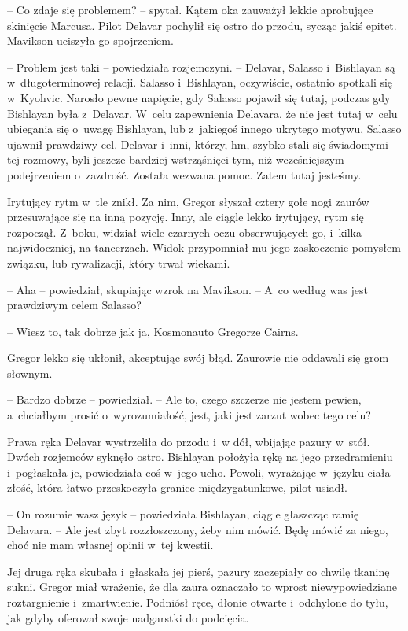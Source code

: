 \documentclass[oneside,polish,12pt,sfheadings]{mwbk}
\begin{document}
-- Co zdaje się problemem? -- spytał. Kątem oka zauważył lekkie aprobujące
skinięcie Marcusa. Pilot Delavar pochylił się ostro do przodu, sycząc
jakiś epitet. Mavikson uciszyła go spojrzeniem.

-- Problem jest taki -- powiedziała rozjemczyni. -- Delavar, Salasso i~Bishlayan są w~długoterminowej relacji. Salasso i~Bishlayan, oczywiście,
ostatnio spotkali się w~Kyohvic. Narosło pewne napięcie, gdy Salasso
pojawił się tutaj, podczas gdy Bishlayan była z~Delavar. W~celu
zapewnienia Delavara, że nie jest tutaj w~celu ubiegania się o~uwagę
Bishlayan, lub z~jakiegoś innego ukrytego motywu, Salasso ujawnił
prawdziwy cel. Delavar i~inni, którzy, hm, szybko stali się świadomymi
tej rozmowy, byli jeszcze bardziej wstrząśnięci tym, niż wcześniejszym
podejrzeniem o~zazdrość. Została wezwana pomoc. Zatem tutaj jesteśmy.

Irytujący rytm w~tle znikł. Za nim, Gregor słyszał cztery gołe nogi
zaurów przesuwające się na inną pozycję. Inny, ale ciągle lekko
irytujący, rytm się rozpoczął. Z~boku, widział wiele czarnych oczu
obserwujących go, i~kilka najwidoczniej, na tancerzach. Widok
przypomniał mu jego zaskoczenie pomysłem związku, lub rywalizacji, który
trwał wiekami.

-- Aha -- powiedział, skupiając wzrok na Mavikson. -- A~co według was jest
prawdziwym celem Salasso?

-- Wiesz to, tak dobrze jak ja, Kosmonauto Gregorze Cairns.

Gregor lekko się ukłonił, akceptując swój błąd. Zaurowie nie oddawali
się grom słownym.

-- Bardzo dobrze -- powiedział. -- Ale to, czego szczerze nie jestem
pewien, a~chciałbym prosić o~wyrozumiałość, jest, jaki jest zarzut wobec
tego celu?

Prawa ręka Delavar wystrzeliła do przodu i~w dół, wbijając pazury w~stół. Dwóch rozjemców syknęło ostro. Bishlayan położyła rękę na jego
przedramieniu i~pogłaskała je, powiedziała coś w~jego ucho. Powoli,
wyrażając w~języku ciała złość, która łatwo przeskoczyła granice
międzygatunkowe, pilot usiadł.

-- On rozumie wasz język -- powiedziała Bishlayan, ciągle głaszcząc ramię
Delavara. -- Ale jest zbyt rozzłoszczony, żeby nim mówić. Będę mówić za
niego, choć nie mam własnej opinii w~tej kwestii.

Jej druga ręka skubała i~głaskała jej pierś, pazury zaczepiały co chwilę
tkaninę sukni. Gregor miał wrażenie, że dla zaura oznaczało to wprost
niewypowiedziane roztargnienie i~zmartwienie. Podniósł ręce, dłonie
otwarte i~odchylone do tyłu, jak gdyby oferował swoje nadgarstki do
podcięcia.
\end{document}
